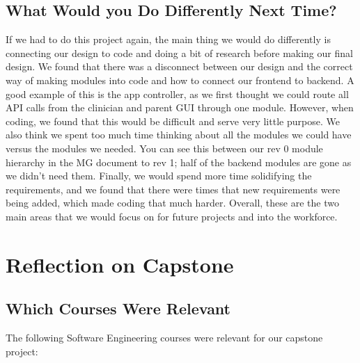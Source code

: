\documentclass{article}
\begin{document}
\subsection{What Would you Do Differently Next Time?}

\hspace{2em}If we had to do this project again, the main thing we would do differently is connecting our design to code and doing a bit of research before making our final design. 
We found that there was a disconnect between our design and the correct way of making modules into code and how to connect our frontend to backend. A good example of this is 
the app controller, as we first thought we could route all API calls from the clinician and parent GUI through one module. However, when coding, we found that this would be 
difficult and serve very little purpose. We also think we spent too much time thinking about all the modules we could have versus the modules we needed. You can see this between our
rev 0 module hierarchy in the MG document to rev 1; half of the backend modules are gone as we didn't need them. Finally, we would spend more time solidifying the requirements, and we found that 
there were times that new requirements were being added, which made coding that much harder. Overall, these are the two main areas that we would focus on for future projects and into the workforce.

\newpage

\section{Reflection on Capstone}


\subsection{Which Courses Were Relevant}

The following Software Engineering courses were relevant for our capstone project: 
\end{document}
